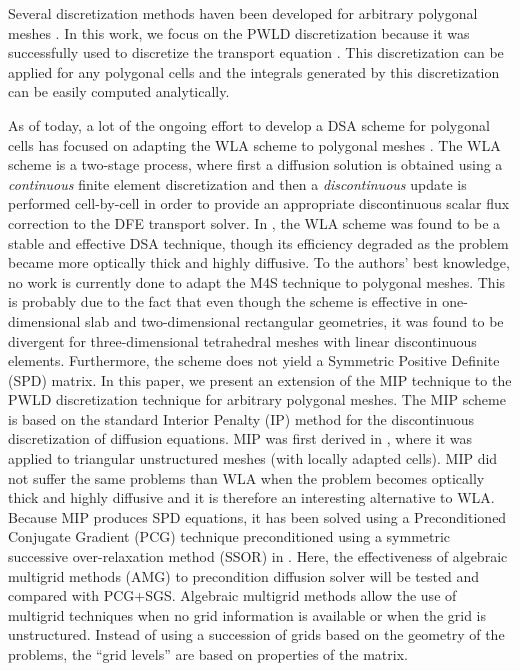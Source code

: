 
Several discretization methods haven been developed for 
arbitrary polygonal meshes \cite{pwld_2d,pwld_3d,cfm_dfm,pwl_diffusion,
palmer_fe,mimetic,cell_centered_diff,palmer_proc,palmer_ane,wachspress,pwbld}.
In this work, we focus on the PWLD discretization because it was successfully
used to discretize the transport equation \cite{pwld_2d,pwld_3d}. This
discretization can be applied for any polygonal cells and the integrals
generated by this discretization can be easily computed analytically. 

As of today, a lot of the ongoing effort to develop a DSA scheme for 
polygonal cells has focused on adapting the WLA scheme to polygonal meshes
\cite{cfm_dfm,wla_pwl}. The WLA scheme is a two-stage process, where first a
diffusion solution is obtained using a {\em continuous} finite element
discretization and then a {\em discontinuous } update is performed cell-by-cell 
in order to provide an appropriate discontinuous scalar flux correction to the DFE transport 
solver. In \cite{consistent_p1}, the WLA scheme was
found to be a stable and effective DSA technique, though its efficiency
degraded as the problem became more optically thick and highly diffusive.
To the authors' best knowledge, no work is currently done to adapt the M4S 
technique to polygonal meshes. This is probably due to the fact
that even though the scheme is effective in one-dimensional slab and
two-dimensional rectangular geometries, it was found to be divergent for
three-dimensional tetrahedral meshes with linear discontinuous elements.
Furthermore, the scheme does not yield a Symmetric Positive Definite (SPD)
matrix. In this paper, we present an extension of the MIP technique to the
PWLD discretization technique for arbitrary polygonal meshes.
The MIP scheme is based on the standard Interior Penalty (IP) method for the
discontinuous discretization of diffusion equations. MIP was first derived in
\cite{mip}, where it was applied to triangular unstructured meshes (with
locally adapted cells). MIP did not suffer the same problems than WLA when the
problem becomes optically thick and highly diffusive and it is therefore an
interesting alternative to WLA. Because MIP produces SPD equations, it has been 
solved using a Preconditioned Conjugate Gradient (PCG) technique preconditioned 
using a symmetric successive over-relaxation method (SSOR) in \cite{mip}. Here, 
the effectiveness of algebraic multigrid methods (AMG) to precondition diffusion
solver \cite{amg,amg_course} will be tested and compared with PCG+SGS.
Algebraic multigrid methods allow the use of multigrid techniques when no grid
information is available or when the grid is unstructured. Instead of using a
succession of grids based on the geometry of the problems, the ``grid levels''
are based on properties of the matrix.

